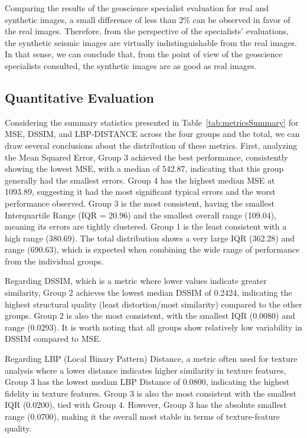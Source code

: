 \documentclass{ieeeaccess}
\begin{document}
Comparing the results of the geoscience specialist evaluation for real and synthetic images, a small difference of less than 2\% can be observed in favor of the real images. Therefore, from the perspective of the specialists' evaluations, the synthetic seismic images are virtually indistinguishable from the real images. In that sense, we can conclude that, from the point of view of the geoscience specialists consulted, the synthetic images are as good as real images.

\subsection{Quantitative Evaluation} 

Considering the summary statistics presented in Table~\ref{tab:metricsSummary} for MSE, DSSIM, and LBP-DISTANCE across the four groups and the total, we can draw several conclusions about the distribution of these metrics. First, analyzing the Mean Squared Error, Group 3 achieved the best performance, consistently showing the lowest MSE, with a median of 542.87, indicating that this group generally had the smallest errors. Group 4 has the highest median MSE at 1093.89, suggesting it had the most significant typical errors and the worst performance observed. Group 3 is the most consistent, having the smallest Interquartile Range (IQR = 20.96) and the smallest overall range (109.04), meaning its errors are tightly clustered. Group 1 is the least consistent with a high range (380.69). The total distribution shows a very large IQR (362.28) and range (690.63), which is expected when combining the wide range of performance from the individual groups.

Regarding DSSIM, which is a metric where lower values indicate greater similarity, Group 2 achieves the lowest median DSSIM of 0.2424, indicating the highest structural quality (least distortion/most similarity) compared to the other groups. Group 2 is also the most consistent, with the smallest IQR (0.0080) and range (0.0293). It is worth noting that all groups show relatively low variability in DSSIM compared to MSE.

Regarding LBP (Local Binary Pattern) Distance, a metric often used for texture analysis where a lower distance indicates higher similarity in texture features, Group 3 has the lowest median LBP Distance of 0.0800, indicating the highest fidelity in texture features. Group 3 is also the most consistent with the smallest IQR (0.0200), tied with Group 4. However, Group 3 has the absolute smallest range (0.0700), making it the overall most stable in terms of texture-feature quality.
\end{document}
